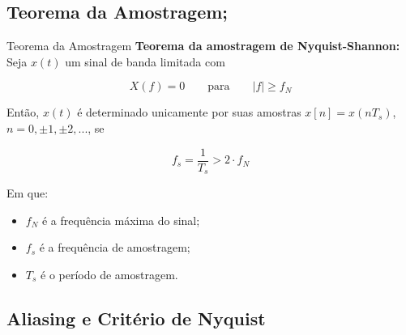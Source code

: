 \documentclass{beamer}
\begin{document}
\subsection{Teorema da Amostragem;}

\begin{frame}{Teorema da Amostragem}
    \textbf{Teorema da amostragem de Nyquist-Shannon:} Seja $x(t)$ um sinal de banda limitada com
    
    \begin{equation}
        X(f) = 0 \qquad \text{para} \qquad |f| \geq f_N
    \end{equation}
    
    Então, $x(t)$ é determinado unicamente por suas amostras $x[n] = x(nT_s)$, $n = 0, ±1, ±2, ...$, se
    
    \begin{equation}
        f_s = \frac{1}{T_s} > 2 \cdot f_N
    \end{equation}

    Em que:
    \begin{itemize}
        \item $f_N$ é a frequência máxima do sinal;
        \item $f_s$ é a frequência de amostragem;
        \item $T_s$ é o período de amostragem.
    \end{itemize}
\end{frame}

\subsection{Aliasing e Critério de Nyquist}
\end{document}
